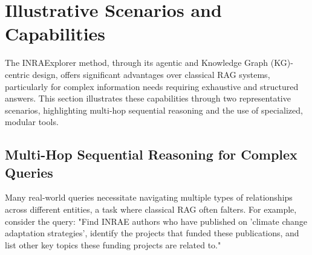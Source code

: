 \documentclass{ecai}
\begin{document}

\section{Illustrative Scenarios and Capabilities}

The INRAExplorer method, through its agentic and Knowledge Graph (KG)-centric design, offers significant advantages over classical RAG systems, particularly for complex information needs requiring exhaustive and structured answers. This section illustrates these capabilities through two representative scenarios, highlighting multi-hop sequential reasoning and the use of specialized, modular tools.

\subsection{Multi-Hop Sequential Reasoning for Complex Queries}

Many real-world queries necessitate navigating multiple types of relationships across different entities, a task where classical RAG often falters. For example, consider the query: "Find INRAE authors who have published on 'climate change adaptation strategies', identify the projects that funded these publications, and list other key topics these funding projects are related to."
\end{document}
